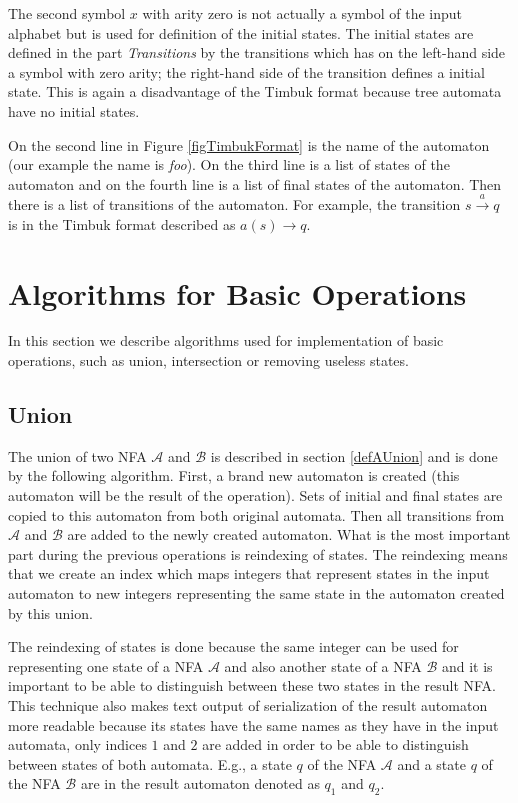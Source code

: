 The second symbol $x$ with arity zero is not actually a symbol of the input alphabet but is used for definition of the initial states. The
initial states are defined in the part \emph{Transitions} by the transitions which has on the left-hand side a symbol with zero arity; the
right-hand side of the transition defines a initial state. This is again a disadvantage
of the Timbuk format because tree automata have no initial states.

On the second line in Figure \ref{figTimbukFormat} is the name of the automaton (our example the name is \emph{foo}). 
On the third line is a list of states of the automaton and on the fourth line is a list of final states of the automaton.
Then there is a list of transitions of the automaton. 
For example, the transition $s \xrightarrow{a} q$ is in the Timbuk format described as $a(s)\rightarrow q$.

\section{Algorithms for Basic Operations}
In this section we describe algorithms used for implementation of basic operations, such as union, intersection or removing useless states. 

\subsection{Union}
The union of two NFA $\mathcal{A}$ and $\mathcal{B}$ is described in section \ref{defAUnion} and
is done by the following algorithm. First, a brand new automaton is created (this automaton
will be the result of the operation). 
Sets of initial and final states are copied to this automaton from both original automata. Then all transitions from $\mathcal{A}$ and
$\mathcal{B}$ are added to the newly created automaton. What is the most important part during the previous operations is reindexing of states. 
The reindexing means that we create an index which maps
integers that represent states in the input automaton to new integers representing the same state in the automaton created by this union.

The reindexing of states is done because the same integer can be used for representing one state of a NFA $\mathcal{A}$ 
and also another state of a NFA $\mathcal{B}$ and it is important
to be able to distinguish between these two states in the result NFA. This technique also makes text output of serialization of the result automaton 
more readable because its states have the same names as they have in the input automata, only indices $1$ and $2$ are added in order to be able to 
distinguish between states of both automata. E.g., a state $q$ of the NFA $\mathcal{A}$ and a state $q$ of the 
NFA $\mathcal{B}$ are in the result automaton denoted as $q_1$ and $q_2$.

